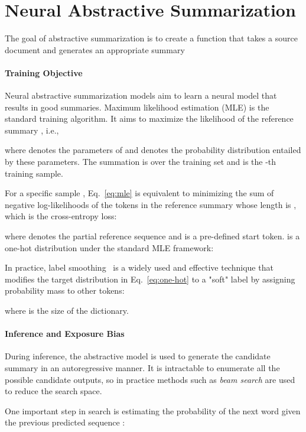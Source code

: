 \documentclass[11pt]{article}
\begin{document}
\section{Neural Abstractive Summarization}

The goal of abstractive summarization is to create a function  that takes a source document  and generates an appropriate summary 


\paragraph{Training Objective}


Neural abstractive summarization models aim to learn a neural model  that results in good summaries.
Maximum likelihood estimation (MLE) is the standard training algorithm. It aims to maximize the likelihood of the reference summary , i.e.,

where  denotes the parameters of  and  denotes the probability distribution entailed by these parameters. 
The summation is over the training set and  is the -th training sample.

For a specific sample , Eq.~\ref{eq:mle} is equivalent to minimizing the sum of negative log-likelihoods of the tokens  in the reference summary  whose length is , which is the cross-entropy loss:

where  denotes the partial reference sequence  and  is a pre-defined start token.
 is a one-hot distribution under the standard MLE framework:


In practice, label smoothing~\citep{7780677} is a widely used and effective technique that modifies the target distribution in Eq.~\ref{eq:one-hot} to a "soft" label by assigning probability mass  to other tokens:

where  is the size of the dictionary.

\paragraph{Inference and Exposure Bias}

During inference, the abstractive model  is used to generate the candidate summary in an autoregressive manner.
It is intractable to enumerate all the possible candidate outputs, so in practice methods such as \textit{beam search} are used to reduce the search space.

One important step in search is estimating the probability of the next word  given the previous predicted sequence :
\end{document}
